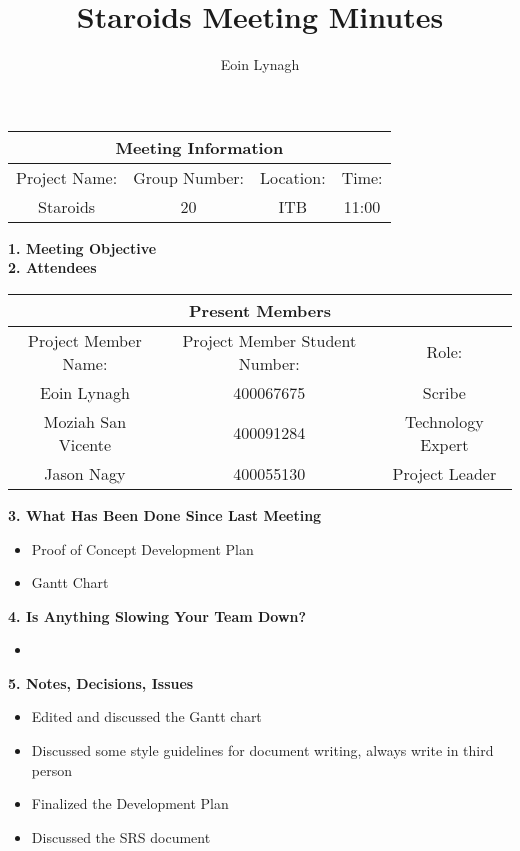 \documentclass[12pt]{article}
\title{Staroids Meeting Minutes}
\author{Eoin Lynagh}
\begin{document}
\maketitle
\begin{center}
 \begin{tabular}{| c | c | c |  c |} 
 \hline
 \multicolumn{4}{|c|}{Meeting Information} \\
\hline
 Project Name: & Group Number: & Location: & Time: \\ 
 \hline
 Staroids & 20 & ITB & 11:00 \\
\hline
\end{tabular}
\end{center}
\begin{flushleft}


\textbf{1. Meeting Objective}\\


\textbf{2. Attendees}\\
\begin{center}
 \begin{tabular}{|c | c | c | } 
 \hline
 \multicolumn{3}{|c|}{Present Members} \\
\hline
 Project Member Name: & Project Member Student Number: & Role: \\ 
 \hline\hline
 Eoin Lynagh & 400067675 & Scribe \\
\hline
Moziah San Vicente & 400091284 & Technology Expert \\
\hline
 Jason Nagy & 400055130 & Project Leader \\
\hline
\end{tabular}
\end{center}

\textbf{3. What Has Been Done Since Last Meeting}\\
\begin{itemize}
\item Proof of Concept Development Plan
\item Gantt Chart
\end{itemize}

\textbf{4. Is Anything Slowing Your Team Down?}\\
\begin{itemize}
\item 
\end{itemize}

\textbf{5. Notes, Decisions, Issues}\\
\begin{itemize}
\item Edited and discussed the Gantt chart
\item Discussed some style guidelines for document writing, always write in third person
\item Finalized the Development Plan
\item Discussed the SRS document
\end{itemize}



\end{flushleft}
\end{document}
